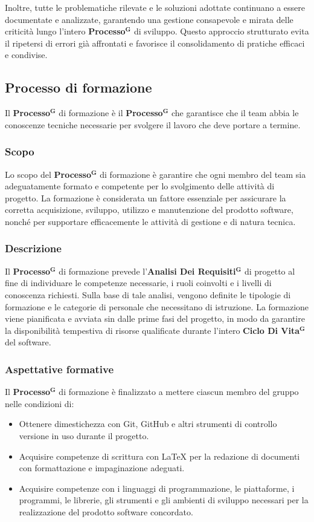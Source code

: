 \documentclass[a4paper,12pt]{article}
\newcommand{\term}[1]{\textbf{#1}$^\mathbf{G}$}
\begin{document}
Inoltre, tutte le problematiche rilevate e le soluzioni adottate continuano a essere documentate e analizzate, garantendo una gestione consapevole e mirata delle criticità lungo l’intero \term{Processo} di sviluppo. Questo approccio strutturato evita il ripetersi di errori già affrontati e favorisce il consolidamento di pratiche efficaci e condivise.

\subsection{Processo di formazione} \label{sec:processo-formazione}
Il \term{Processo} di formazione è il \term{Processo} che garantisce che il team abbia le conoscenze tecniche necessarie per svolgere il lavoro che deve portare a termine.

\subsubsection{Scopo}
Lo scopo del \term{Processo} di formazione è garantire che ogni membro del team sia adeguatamente formato e competente per lo svolgimento delle attività di progetto. La formazione è considerata un fattore essenziale per assicurare la corretta acquisizione, sviluppo, utilizzo e manutenzione del prodotto software, nonché per supportare efficacemente le attività di gestione e di natura tecnica.

\subsubsection{Descrizione}
Il \term{Processo} di formazione prevede l’\term{Analisi Dei Requisiti} di progetto al fine di individuare le competenze necessarie, i ruoli coinvolti e i livelli di conoscenza richiesti. Sulla base di tale analisi, vengono definite le tipologie di formazione e le categorie di personale che necessitano di istruzione. La formazione viene pianificata e avviata sin dalle prime fasi del progetto, in modo da garantire la disponibilità tempestiva di risorse qualificate durante l’intero \term{Ciclo Di Vita} del software.
\subsubsection{Aspettative formative}
Il \term{Processo} di formazione è finalizzato a mettere ciascun membro del gruppo nelle condizioni di:
\begin{itemize}
\item Ottenere dimestichezza con Git, GitHub e altri strumenti di controllo versione in uso durante il progetto.
\item Acquisire competenze di scrittura con \LaTeX{} per la redazione di documenti con formattazione e impaginazione adeguati.
\item Acquisire competenze con i linguaggi di programmazione, le piattaforme, i programmi, le librerie, gli strumenti e gli ambienti di sviluppo necessari per la realizzazione del prodotto software concordato.
\end{itemize}
\end{document}
